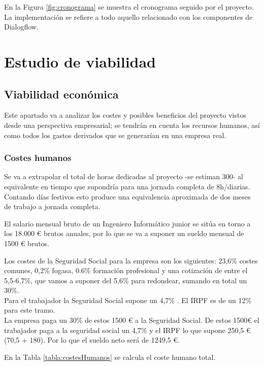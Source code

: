 En la Figura \ref{fig:cronograma} se muestra el cronograma seguido por el proyecto. La implementación se refiere a todo aquello relacionado con los componentes de Dialogflow.



\newpage
\section{Estudio de viabilidad}

\subsection{Viabilidad económica}

Este apartado va a analizar los costes y posibles beneficios del proyecto vistos desde una perspectiva empresarial; se tendrán en cuenta los recursos humanos, así como todos los gastos derivados que se generarían en una empresa real.

\subsubsection{Costes humanos}

Se va a extrapolar el total de horas dedicadas al proyecto -se estiman 300- al equivalente en tiempo que supondría para una jornada completa de 8h/diarias. Contando días festivos esto produce una equivalencia aproximada de dos meses de trabajo a jornada completa. 

El salario mensual bruto de un Ingeniero Informático junior se sitúa en torno a los 18.000 \euro{} brutos anuales, por lo que se va a suponer un sueldo mensual de 1500 \euro{} brutos.

Los costes de la Seguridad Social para la empresa son los siguientes: 23,6\% costes comunes, 0,2\% fogasa, 0.6\% formación profesional y una cotización de entre el 5,5-6,7\%, que vamos a suponer del 5,6\% para redondear, sumando en total un 30\%.\\
Para el trabajador la Seguridad Social supone un 4,7\% \cite{cotizacion}. El IRPF es de un 12\% para este tramo. \cite{irpf} \\
La empresa paga un 30\% de estos 1500 \euro{} a la Seguridad Social.
De estos 1500€ el trabajador paga a la seguridad social un 4,7\% y el IRPF lo que supone 250,5 \euro{} (70,5 + 180). 
Por lo que el sueldo neto será de 1249,5 \euro{}.

En la Tabla \ref{tabla:costesHumanos} se calcula el coste humano total.

